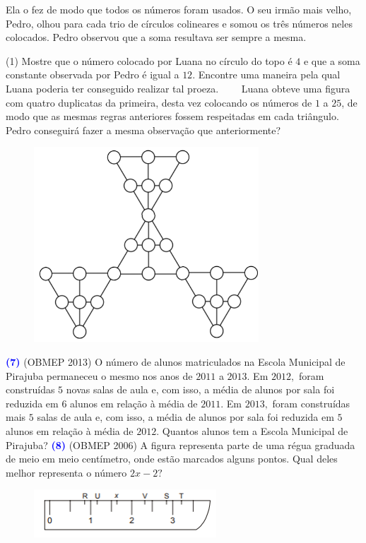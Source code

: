\documentclass[12pt, a4paper]{article}
\newcommand{\negrito}[1]{\mbox{\boldmath{$#1$}}}
\begin{document}
Ela o fez de modo que todos os números foram usados. O seu irmão mais velho, Pedro, olhou para cada trio de círculos colineares e somou os três números neles colocados. Pedro observou que a soma resultava ser sempre a mesma.
\begin{tasks}[counter-format={(tsk[a])},label-width=3.6ex, label-format = {\bfseries}, column-sep = {0pt}](1)
\task[\textcolor{Floresta}{$\negrito{(a)} $}] Mostre que o número colocado por Luana no círculo do topo é $4$ e que a soma constante observada por Pedro é igual a $12.$
\task[\textcolor{Floresta}{$\negrito{(b)} $}] Encontre uma maneira pela qual Luana poderia ter conseguido realizar tal proeza.
\task[\textcolor{Floresta}{$\negrito{(c)} \varheart$}] \ \ \ \ Luana obteve uma figura com quatro duplicatas da primeira, desta vez colocando os números de $1$ a $25$, de modo que as mesmas regras anteriores fossem respeitadas em cada triângulo. Pedro conseguirá fazer a mesma observação que anteriormente?
\end{tasks}
\begin{figure}[!h]
    \centering
    \includegraphics[scale=0.54]{Listas do PIC/var8encontro1ciclo1.png}
\end{figure}
\textcolor{blue}{\bf(7)} (OBMEP 2013) O número de alunos matriculados na Escola Municipal de Pirajuba permaneceu o mesmo nos anos de $2011$ a $2013.$ Em $2012,$ foram construídas $5$ novas salas de aula e,
com isso, a média de alunos por sala foi reduzida em $6$ alunos em relação à média de
$2011.$ Em $2013,$ foram construídas mais $5$ salas de aula e, com isso, a média de alunos
por sala foi reduzida em $5$ alunos em relação à média de $2012.$ Quantos alunos tem a
Escola Municipal de Pirajuba?
\newline\newline
\textcolor{blue}{\bf(8)} (OBMEP 2006) A figura representa parte de uma régua graduada de meio em meio centímetro, onde estão marcados alguns pontos. Qual deles melhor representa o número $2x - 2?$
\begin{figure}[!h]
    \centering
    \includegraphics{Listas do PIC/8encontro1ciclo1.png}
\end{figure}
\end{document}
